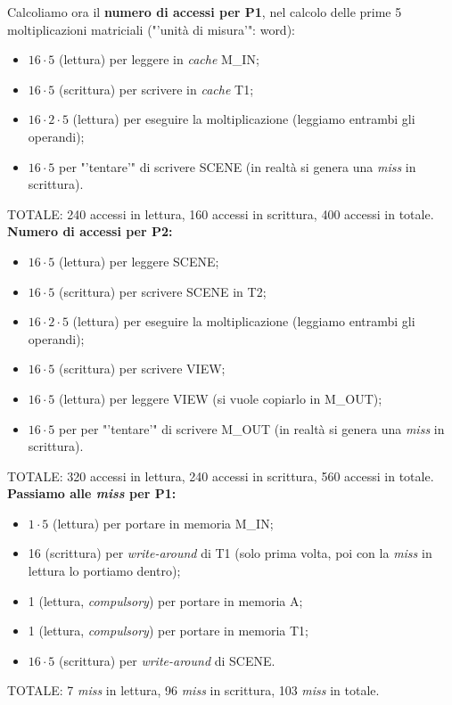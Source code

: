 Calcoliamo ora il \textbf{numero di accessi per P1}, nel calcolo delle prime 5 moltiplicazioni matriciali ("'unità di misura'": word):
\begin{itemize}
\item $16\cdot 5$ (lettura) per leggere in \textit{cache} M\_IN;
\item $16\cdot 5$ (scrittura) per scrivere in \textit{cache} T1;
\item $16 \cdot 2 \cdot 5$ (lettura) per eseguire la moltiplicazione (leggiamo entrambi gli operandi);
\item $16\cdot 5$ per "'tentare'" di scrivere SCENE (in realtà si genera una \textit{miss} in scrittura).
\end{itemize}
TOTALE: 240 accessi in lettura, 160 accessi in scrittura, 400 accessi in totale. \\
\textbf{Numero di accessi per P2:}
\begin{itemize}
\item $16\cdot 5$ (lettura) per leggere SCENE;
\item $16\cdot 5$ (scrittura) per scrivere SCENE in T2;
\item $16 \cdot 2 \cdot 5$ (lettura) per eseguire la moltiplicazione (leggiamo entrambi gli operandi);
\item $16\cdot 5$ (scrittura) per scrivere VIEW;
\item $16\cdot 5$ (lettura) per leggere VIEW (si vuole copiarlo in M\_OUT);
\item $16\cdot 5$ per per "'tentare'" di scrivere M\_OUT (in realtà si genera una \textit{miss} in scrittura).
\end{itemize}
TOTALE: 320 accessi in lettura, 240 accessi in scrittura, 560 accessi in totale.\\
\textbf{Passiamo alle \textit{miss} per P1:}
\begin{itemize}
\item $1\cdot 5$ (lettura) per portare in memoria M\_IN;
\item 16 (scrittura) per \textit{write-around} di T1 (solo prima volta, poi con la \textit{miss} in lettura lo portiamo dentro);
\item 1 (lettura, \textit{compulsory}) per portare in memoria A;
\item 1 (lettura, \textit{compulsory}) per portare in memoria T1;
\item $16\cdot 5$ (scrittura) per \textit{write-around} di SCENE.
\end{itemize}
TOTALE: 7 \textit{miss} in lettura, 96 \textit{miss} in scrittura, 103 \textit{miss} in totale. \\
